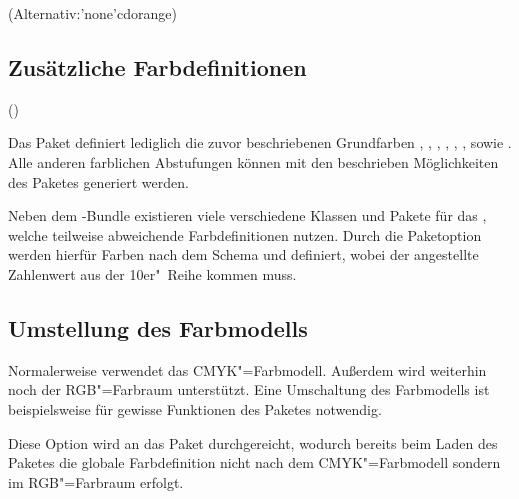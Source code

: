 \begin{DeclareEntity}{}

\begin{Declaration}
  {}
  (Alternativ:\Color*'none'{cdorange})
\printdeclarationlist
{}
\end{Declaration}
%



\subsection{Zusätzliche Farbdefinitionen}

\begin{Declaration}
  {}
  ()
\printdeclarationlist

Das Paket  definiert lediglich die zuvor beschriebenen 
Grundfarben , , , , 
, ,  sowie . 
Alle anderen farblichen Abstufungen können mit den beschrieben Möglichkeiten 
des Paketes  generiert werden.
\end{Declaration}

\begin{Declaration}
  {}
\printdeclarationlist

Neben dem \TUDScript-Bundle existieren viele verschiedene Klassen und Pakete 
für das \CD, welche teilweise abweichende Farbdefinitionen nutzen. Durch die 
Paketoption  werden hierfür Farben nach dem Schema 
 und  definiert, wobei 
der angestellte Zahlenwert aus der 10er"~Reihe kommen muss.
\end{Declaration}



\subsection{%
  Umstellung des Farbmodells%
}

Normalerweise verwendet  das CMYK"=Farbmodell. Außerdem 
wird weiterhin noch der RGB"=Farbraum unterstützt. Eine Umschaltung des 
Farbmodells ist beispielsweise für gewisse Funktionen des Paketes 
 notwendig.

\begin{Declaration}
  {}
\printdeclarationlist

Diese Option wird an das Paket  durchgereicht, wodurch bereits 
beim Laden des Paketes die globale Farbdefinition nicht nach dem 
CMYK"=Farbmodell sondern im RGB"=Farbraum erfolgt.
\end{Declaration}


\end{DeclareEntity}
